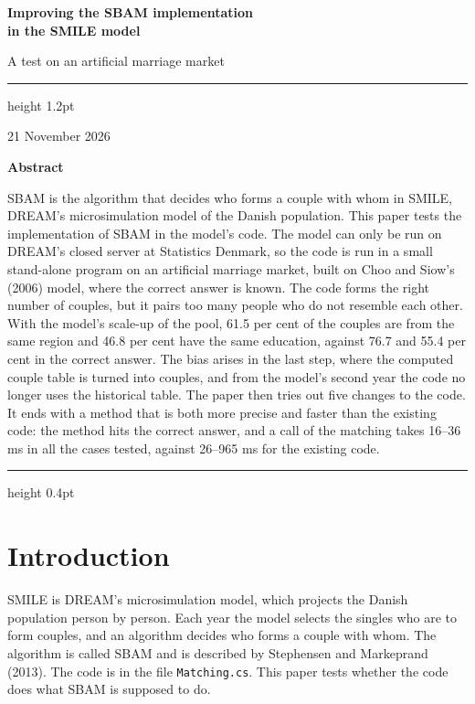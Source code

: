 \documentclass[12pt,a4paper]{article}
\newcommand{\kode}[1]{\texttt{#1}}
\begin{document}
\thispagestyle{plain}

{\raggedright
{\sffamily\bfseries\LARGE\color{accent}Improving the SBAM implementation\\ in the SMILE model\par}
\vspace{6pt}
{\sffamily\large\color{black!70}A test on an artificial marriage market\par}
\vspace{10pt}
{\color{accent}\hrule height 1.2pt}
\vspace{8pt}
{\sffamily\small\color{black!60}21 November 2026\par}
}
\vspace{1.4em}

{\sffamily\bfseries\color{accent}Abstract\par}
\vspace{-2pt}
{\small
SBAM is the algorithm that decides who forms a couple with whom in SMILE, DREAM's microsimulation
model of the Danish population. This paper tests the implementation of SBAM in the model's code. The
model can only be run on DREAM's closed server at Statistics Denmark, so the code is run in a small
stand-alone program on an artificial marriage market, built on Choo and Siow's (2006) model, where
the correct answer is known. The code forms the right number of couples, but it pairs too many
people who do not resemble each other. With the model's scale-up of the pool, 61.5 per cent of the
couples are from the same region and 46.8 per cent have the same education, against 76.7 and 55.4
per cent in the correct answer. The bias arises in the last step, where the computed couple table
is turned into couples, and from the model's second year the code no longer uses the historical
table. The paper then tries out five changes to the code. It ends with a method that is both more
precise and faster than the existing code: the method hits the correct answer, and a call of the
matching takes 16--36 ms in all the cases tested, against 26--965 ms for the existing code.\par}
\vspace{4pt}
{\color{black!25}\hrule height 0.4pt}
\vspace{0.4em}

\section{Introduction}

SMILE is DREAM's microsimulation model, which projects the Danish population person by person. Each
year the model selects the singles who are to form couples, and an algorithm decides who forms a
couple with whom. The algorithm is called SBAM and is described by Stephensen and Markeprand (2013).
The code is in the file \kode{Matching.cs}. This paper tests whether the code does what SBAM is
supposed to do.
\end{document}
